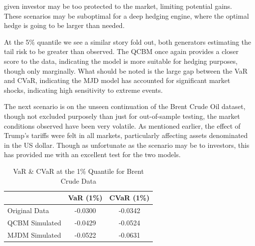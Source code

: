 \documentclass[12pt]{article}
\newcommand{\newp}
    {
    \vskip 0.5cm 
  }
\numberwithin{equation}{section}
\begin{document}
given investor may be too protected to the market, limiting potential gains. These 
scenarios may be suboptimal for a deep hedging engine, where the optimal hedge 
is going to be larger than needed. 
\newp 
At the 5\% quantile we see a similar story fold out, both generators estimating 
the tail risk to be greater than observed. The QCBM once again provides a closer 
score to the data, indicating the model is more suitable for hedging purposes, 
though only marginally. What should be noted is the large gap between the VaR 
and CVaR, indicating the MJD model has accounted for significant market shocks,
indicating high sensitivity to extreme events.\\
\newp 
The next scenario is on the unseen continuation of the Brent Crude Oil dataset,
though not excluded purposely than just for out-of-sample testing, the market 
conditions observed have been very volatile. As mentioned earlier, the effect of 
Trump's tariffs were felt in all markets, particularly affecting assets denominated 
in the US dollar. Though as unfortunate as the scenario may be to investors, this 
has provided me with an excellent test for the two models. 
\begin{table}[h!]
\centering
\begin{tabular}{lcc}
\hline
\textbf{} & \textbf{VaR (1\%)} & \textbf{CVaR (1\%)} \\
\hline
Original Data     & -0.0300 & -0.0342 \\
QCBM Simulated    & -0.0429 & -0.0524 \\
MJDM Simulated    & -0.0522 & -0.0631 \\
\hline
\end{tabular}
\caption{VaR \& CVaR at the 1\% Quantile for Brent Crude Data}
\label{tab:cvar_1_brent}
\end{table}
\end{document}
